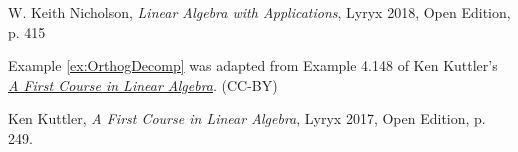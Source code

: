 \documentclass{ximera}
\begin{document}
W. Keith Nicholson, {\it Linear Algebra with Applications}, Lyryx 2018, Open Edition, p. 415 

Example \ref{ex:OrthogDecomp}  was adapted from Example 4.148  of Ken Kuttler's \href{https://open.umn.edu/opentextbooks/textbooks/a-first-course-in-linear-algebra-2017}{\it A First Course in Linear Algebra}. (CC-BY)

Ken Kuttler, {\it  A First Course in Linear Algebra}, Lyryx 2017, Open Edition, p. 249. 



\end{document}
